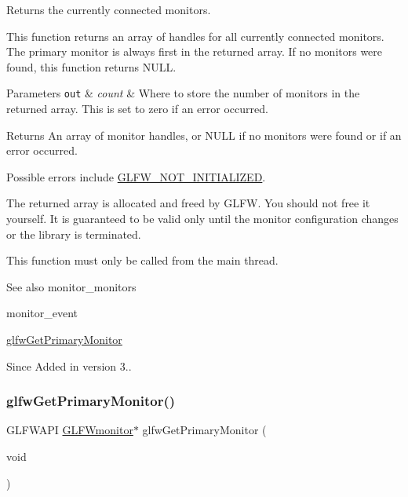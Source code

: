 Returns the currently connected monitors. 

This function returns an array of handles for all currently connected monitors. The primary monitor is always first in the returned array. If no monitors were found, this function returns {\ttfamily N\+U\+LL}.


\begin{DoxyParams}[1]{Parameters}
\mbox{\tt out}  & {\em count} & Where to store the number of monitors in the returned array. This is set to zero if an error occurred. \\
\hline
\end{DoxyParams}
\begin{DoxyReturn}{Returns}
An array of monitor handles, or {\ttfamily N\+U\+LL} if no monitors were found or if an error occurred.
\end{DoxyReturn}
Possible errors include \hyperlink{group__errors_ga2374ee02c177f12e1fa76ff3ed15e14a}{G\+L\+F\+W\+\_\+\+N\+O\+T\+\_\+\+I\+N\+I\+T\+I\+A\+L\+I\+Z\+ED}.

The returned array is allocated and freed by G\+L\+FW. You should not free it yourself. It is guaranteed to be valid only until the monitor configuration changes or the library is terminated.

This function must only be called from the main thread.

\begin{DoxySeeAlso}{See also}
monitor\+\_\+monitors 

monitor\+\_\+event 

\hyperlink{group__monitor_ga59ea49f377fe701dd76764183e64d9f4}{glfw\+Get\+Primary\+Monitor}
\end{DoxySeeAlso}
\begin{DoxySince}{Since}
Added in version 3.. 
\end{DoxySince}
\mbox{\label{group__monitor_ga59ea49f377fe701dd76764183e64d9f4}} 
\subsubsection{\texorpdfstring{glfw\+Get\+Primary\+Monitor()}{glfwGetPrimaryMonitor()}}
{\footnotesize\ttfamily G\+L\+F\+W\+A\+PI \hyperlink{group__monitor_ga8d9efd1cde9426692c73fe40437d0ae3}{G\+L\+F\+Wmonitor}$\ast$ glfw\+Get\+Primary\+Monitor (\begin{DoxyParamCaption}\item[{void}]{ }\end{DoxyParamCaption})}



